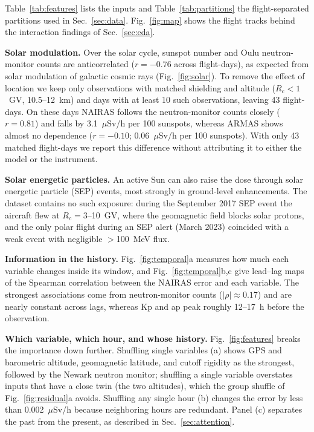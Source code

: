 \documentclass[10pt,twocolumn,letterpaper]{article}
\begin{document}
Table~\ref{tab:features} lists the inputs and Table~\ref{tab:partitions} the
flight-separated partitions used in Sec.~\ref{sec:data}.
Fig.~\ref{fig:map} shows the flight tracks behind the interaction findings of
Sec.~\ref{sec:eda}.

\textbf{Solar modulation.} Over the solar cycle, sunspot number and Oulu
neutron-monitor counts are anticorrelated ($r=-0.76$ across flight-days), as
expected from solar modulation of galactic cosmic rays
(Fig.~\ref{fig:solar}). To remove the effect of location we keep only
observations with matched shielding and altitude ($R_c<1$~GV, 10.5--12~km)
and days with at least 10 such observations, leaving 43 flight-days. On these
days NAIRAS follows the neutron-monitor counts closely ($r=0.81$) and falls
by 3.1~$\mu$Sv/h per 100 sunspots, whereas ARMAS shows almost no dependence
($r=-0.10$; 0.06~$\mu$Sv/h per 100 sunspots). With only 43 matched
flight-days we report this difference without attributing it to either the
model or the instrument.

\textbf{Solar energetic particles.} An active Sun can also raise the dose
through solar energetic particle (SEP) events, most strongly in ground-level
enhancements. The dataset contains no such exposure: during the September
2017 SEP event the aircraft flew at $R_c=3$--10~GV, where the geomagnetic
field blocks solar protons, and the only polar flight during an SEP alert
(March 2023) coincided with a weak event with negligible $>$100~MeV flux.

\textbf{Information in the history.} Fig.~\ref{fig:temporal}a measures how
much each variable changes inside its window, and Fig.~\ref{fig:temporal}b,c
give lead--lag maps of the Spearman correlation between the NAIRAS error and
each variable. The strongest associations come from neutron-monitor counts
($|\rho|\approx0.17$) and are nearly constant across lags, whereas Kp and ap
peak roughly 12--17~h before the observation.

\textbf{Which variable, which hour, and whose history.}
Fig.~\ref{fig:features} breaks the importance down further. Shuffling single
variables (a) shows GPS and barometric altitude, geomagnetic latitude, and
cutoff rigidity as the strongest, followed by the Newark neutron monitor;
shuffling a single variable overstates inputs that have a close twin (the two
altitudes), which the group shuffle of Fig.~\ref{fig:residual}a avoids.
Shuffling any single hour (b) changes the error by less than
0.002~$\mu$Sv/h because neighboring hours are redundant. Panel (c) separates
the past from the present, as described in Sec.~\ref{sec:attention}.
\end{document}
